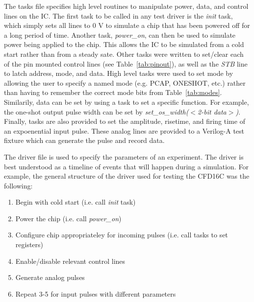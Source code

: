 \documentclass[12pt,oneside,final]{siuethesis}
\theoremstyle{definition}
\begin{document}
\par The tasks file specifies high level routines to manipulate power, data, and control lines on the IC. The first task to be called in any test driver is the \emph{init} task, which simply sets all lines to 0 V to simulate a chip that has been powered off for a long period of time. Another task, \emph{power\_on}, can then be used to simulate power being applied to the chip. This allows the IC to be simulated from a cold start rather than from a steady sate. Other tasks were written to set/clear each of the pin mounted control lines (see Table~\ref{tab:pinout}), as well as the \emph{STB} line to latch address, mode, and data. High level tasks were used to set mode by allowing the user to specify a named mode (e.g. PCAP, ONESHOT, etc.) rather than having to remember the correct mode bits from Table~\ref{tab:modes}. Similarily, data can be set by using a task to set a specific function. For example, the one-shot output pulse width can be set by \emph{set\_os\_width($<$2-bit data$>$)}. Finally, tasks are also provided to set the amplitude, risetime, and firing time of an expoenential input pulse. These analog lines are provided to a Verilog-A test fixture which can generate the pulse and record data.
\par The driver file is used to specify the parameters of an experiment. The driver is best understood as a timeline of events that will happen during a simulation. For example, the general structure of the driver used for testing the CFD16C was the following:

\begin{enumerate}
\item Begin with cold start (i.e. call \emph{init} task)
\item Power the chip (i.e. call \emph{power\_on})
\item Configure chip appropriateley for incoming pulses (i.e. call tasks to set registers)
\item Enable/disable relevant control lines
\item Generate analog pulses
\item Repeat 3-5 for input pulses with different parameters
\end{enumerate}
\end{document}
